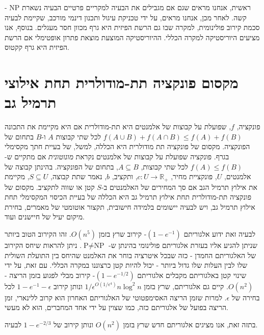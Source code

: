 \begin{hebrew}
ראשית, אנחנו מראים שגם אם מגבילים את הבעיה למקריים פרטיים הבעיה נשארת
$\text{NP}$%
-קשה.
לאחר מכן, אנחנו מראים, על ידי טכניקת עיגול ותכנון דינמי מורכב, שקיימת לבעיה סכמת קירוב פולינומית, למקרה שבו גם הרשת הפיזית היא גרף מכוון חסר מעגלים.
בנוסף, אנו מציעים היוריסטיקה למקרה הכללי.
ההיוריסטיקה המוצעת  מוצאת פתרון אופטימלי אם הרשת הפיזית היא גרף קקטוס.



\section*{\texthebrew{מקסום פונקציה תת-מודולרית תחת אילוצי תרמיל גב}}
פונקציה,
$f$,
שפועלת על קבוצות של אלמנטים היא תת-מודולרית אם היא מקיימת את התכונה
$f(A \cup B) + f(A \cap B) \leq f(A) + f(B)$
לכל שתי קבוצות $A$ ו-$B$ בתחום של הפונקציה.
מקסום של פונקציה תת מודולרית היא הכללה, למשל, של בעיית חתך מקסימלי בגרף.
פונקציה שפועלת על קבוצות  של אלמנטים נקראת
\emph{מונוטונית}
אם מתקיים ש-%
$f(A) \leq f(B)$
לכל שתי קבוצות,
$A \subseteq B$,
בתחום של הפונקציה.
בהינתן קבוצה של אלמנטים, $U$, פונקציית מחיר,
$c:U \to \mathbb{R_+}$,
ותקציב, $b$, נאמר שתת קבוצה,
$S \subseteq U$,
מקיימת את אילוץ תרמיל הגב אם סך המחירים של האלמנטים ב-$S$ קטן או שווה לתקציב.
מקסום של פונקציה תת-מודולרית תחת אילוץ תרמיל גב היא הכללה של בעיית הכיסוי המקסימלי תחת אילוץ תרמיל גב,
ויש לבעיה יישומים בלמידה חישובית, תקצור אוטומטי של מאמרים, בחירת מיקום יעיל של חיישנים ועוד.


לבעיה זאת ידוע אלגוריתם
$(1-e^{-1})$-%
קירוב שרץ בזמן
$O(n^5)$.
זהו הקירוב הטוב ביותר שניתן להגיע אליו בעזרת אלגוריתם פולינומי בהינתן ש-%
$\text{P} \neq \text{NP}$.
ניתן להראות שיחס הקירוב של האלגוריתם החמדן - כזה שבכל איטרציה בוחר את האלמנט שהיחס בין התועלת השולית שלו לבין העלות שלו גדול ביותר - יכול להיות קטן כרצוננו במקרה הכללי.
עם זאת, על ידי שינוי קטן באלגוריתם מקבלים אלגוריתם
$(1 - e^{-1/2})$-%
קירוב מבלי לפגוע בזמן הריצה -
$O(n^2)$.
קיים גם אלגוריתם, שרץ בזמן
$1/\epsilon^{O(1/\epsilon^4)}n\log^2n$
ונותן קירוב
$1 - e^{-1} -\epsilon$
לכל בחירה של
$\epsilon$.
למרות שזמן הריצה האסימפטוטי של האלגוריתם האחרון הוא קרוב ללינארי, זמן הריצה בפועל של אלגוריתם כזה, כמו שצוין על ידי אחד המחברים, הוא לא מעשי.

בתזה זאת, אנו מציגים אלגוריתם חדש שרץ בזמן
$O(n^2)$
ונותן קירוב של
$1 - e^{-2/3}$
לבעיה.









\end{hebrew}
